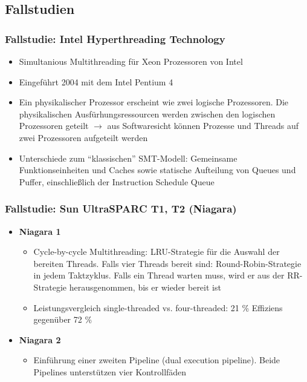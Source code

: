 \subsection{Fallstudien}

\subsubsection{Fallstudie: Intel Hyperthreading Technology}
\begin{itemize}
	\item Simultanious Multithreading für Xeon Prozessoren von Intel
	\item Eingeführt 2004 mit dem Intel Pentium 4
	\item Ein physikalischer Prozessor erscheint wie zwei logische Prozessoren. Die physikalischen Ausfürhungsressourcen werden zwischen den logischen Prozessoren geteilt \(\rightarrow\) aus Softwaresicht können Prozesse und Threads auf zwei Prozessoren aufgeteilt werden
	\item Unterschiede zum "`klassischen"' SMT-Modell: Gemeinsame Funktionseinheiten und Caches sowie statische Aufteilung von Queues und Puffer, einschließlich der Instruction Schedule Queue
\end{itemize}

\subsubsection{Fallstudie: Sun UltraSPARC T1, T2 (Niagara)}
\begin{itemize}
	\item \textbf{Niagara 1}
	\begin{itemize}
		\item Cycle-by-cycle Multithreading: LRU-Strategie für die Auswahl der bereiten Threads. Falls vier Threads bereit sind: Round-Robin-Strategie in jedem Taktzyklus. Falls ein Thread warten muss, wird er aus der RR-Strategie herausgenommen, bis er wieder bereit ist
		\item Leistungsvergleich single-threaded vs. four-threaded: 21 \% Effiziens gegenüber 72 \%
	\end{itemize}
	\item \textbf{Niagara 2}
	\begin{itemize}
		\item Einführung einer zweiten Pipeline (dual execution pipeline). Beide Pipelines unterstützen vier Kontrollfäden
	\end{itemize}
\end{itemize}

